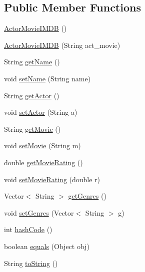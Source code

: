 \subsection*{Public Member Functions}
\begin{DoxyCompactItemize}
\item 
\mbox{\hyperlink{classbridges_1_1data__src__dependent_1_1_actor_movie_i_m_d_b_a5265e7b8ba0613497fae0f4125882413}{Actor\+Movie\+I\+M\+DB}} ()
\item 
\mbox{\hyperlink{classbridges_1_1data__src__dependent_1_1_actor_movie_i_m_d_b_a4eb000ffd59c6c607c01815273d97110}{Actor\+Movie\+I\+M\+DB}} (String act\+\_\+movie)
\item 
String \mbox{\hyperlink{classbridges_1_1data__src__dependent_1_1_actor_movie_i_m_d_b_a4c8151353df4768bb691e1a666884cba}{get\+Name}} ()
\item 
void \mbox{\hyperlink{classbridges_1_1data__src__dependent_1_1_actor_movie_i_m_d_b_abcca7792c68bef1fd8668f6eccf0ab4b}{set\+Name}} (String name)
\item 
String \mbox{\hyperlink{classbridges_1_1data__src__dependent_1_1_actor_movie_i_m_d_b_a59c20f1a3e718ba11fefac6818cf67ee}{get\+Actor}} ()
\item 
void \mbox{\hyperlink{classbridges_1_1data__src__dependent_1_1_actor_movie_i_m_d_b_aa45eca34d84928109ff8439c30e2dd56}{set\+Actor}} (String a)
\item 
String \mbox{\hyperlink{classbridges_1_1data__src__dependent_1_1_actor_movie_i_m_d_b_af44503937d5b0d23a2347e752f435a32}{get\+Movie}} ()
\item 
void \mbox{\hyperlink{classbridges_1_1data__src__dependent_1_1_actor_movie_i_m_d_b_a4747fd2c81481d366d566a6536186d9e}{set\+Movie}} (String m)
\item 
double \mbox{\hyperlink{classbridges_1_1data__src__dependent_1_1_actor_movie_i_m_d_b_a3c13fb368acf3daf652dcaec37ae4809}{get\+Movie\+Rating}} ()
\item 
void \mbox{\hyperlink{classbridges_1_1data__src__dependent_1_1_actor_movie_i_m_d_b_a770bf71b928f997301aab76af5c9b886}{set\+Movie\+Rating}} (double r)
\item 
Vector$<$ String $>$ \mbox{\hyperlink{classbridges_1_1data__src__dependent_1_1_actor_movie_i_m_d_b_a5f85b9d06b1023be3d5fc6fc4e0173d0}{get\+Genres}} ()
\item 
void \mbox{\hyperlink{classbridges_1_1data__src__dependent_1_1_actor_movie_i_m_d_b_a52f0162b1e946d8bbcd9106274dc2ad3}{set\+Genres}} (Vector$<$ String $>$ g)
\item 
int \mbox{\hyperlink{classbridges_1_1data__src__dependent_1_1_actor_movie_i_m_d_b_a7548f74261dfcff05c95479a2f6b96a8}{hash\+Code}} ()
\item 
boolean \mbox{\hyperlink{classbridges_1_1data__src__dependent_1_1_actor_movie_i_m_d_b_adfc8932fb232734cae5e8521561120c8}{equals}} (Object obj)
\item 
String \mbox{\hyperlink{classbridges_1_1data__src__dependent_1_1_actor_movie_i_m_d_b_a5527848441c0ae19ed9588fb4255b869}{to\+String}} ()
\end{DoxyCompactItemize}


